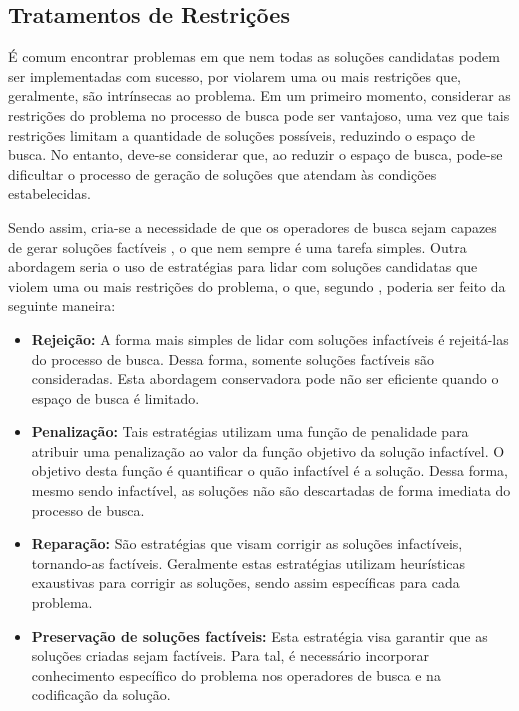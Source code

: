 \subsection{Tratamentos de Restrições}
\label{subsec:subc214}
É comum encontrar problemas em que nem todas as soluções candidatas podem ser implementadas com sucesso, por violarem uma ou mais restrições que, geralmente, são intrínsecas ao problema. Em um primeiro momento, considerar as restrições do problema no processo de busca pode ser vantajoso, uma vez que tais restrições limitam a quantidade de soluções possíveis, reduzindo o espaço de busca. No entanto, deve-se considerar que, ao reduzir o espaço de busca, pode-se dificultar o processo de geração de soluções que atendam às condições estabelecidas.

Sendo assim, cria-se a necessidade de que os operadores de busca sejam capazes de gerar soluções factíveis \cite{Michalewicz2004}, o que nem sempre é uma tarefa simples. Outra abordagem seria o uso de estratégias para lidar com soluções candidatas que violem uma ou mais restrições do problema, o que, segundo , poderia ser feito da seguinte maneira:

\begin{itemize}
\item \textbf{Rejeição:} A forma mais simples de lidar com soluções infactíveis é rejeitá-las do processo de busca. Dessa forma, somente soluções factíveis são consideradas. Esta abordagem conservadora pode não ser eficiente quando o espaço de busca é limitado.
\item \textbf{Penalização:} Tais estratégias utilizam uma função de penalidade para atribuir uma penalização ao valor da função objetivo da solução infactível. O objetivo desta função é quantificar o quão infactível é a solução. Dessa forma, mesmo sendo infactível, as soluções não são descartadas de forma imediata do processo de busca.
\item \textbf{Reparação:} São estratégias que visam corrigir as soluções infactíveis, tornando-as factíveis. Geralmente estas estratégias utilizam heurísticas exaustivas para corrigir as soluções, sendo assim específicas para cada problema.
\item\textbf{Preservação de soluções factíveis:} Esta estratégia visa garantir que as soluções criadas sejam factíveis. Para tal, é necessário incorporar conhecimento específico do problema nos operadores de busca e na codificação da solução.

\end{itemize}

